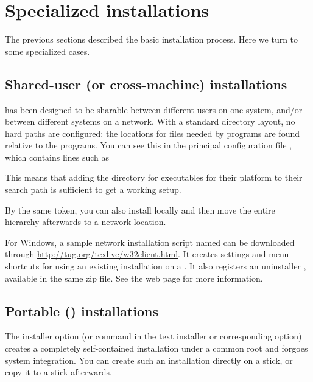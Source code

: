 \documentclass{article}
\begin{document}
\section{Specialized installations}

The previous sections described the basic installation process.  Here we
turn to some specialized cases.

\subsection{Shared-user (or cross-machine) installations}
\label{sec:sharedinstall}

\TL{} has been designed to be sharable between different users on one
system, and/or between different systems on a network. With a standard
directory layout, no hard paths are configured: the locations for files
needed by \TL{} programs are found relative to the programs.  You can
see this in the principal configuration file
, which contains lines such as
This means that adding the directory for \TL{} executables for their
platform to their search path is sufficient to get a working setup.

By the same token, you can also install \TL{} locally and then move
the entire hierarchy afterwards to a network location.

For Windows, a sample network installation script named
 can be downloaded through
\url{http://tug.org/texlive/w32client.html}.  It creates settings and
menu shortcuts for using an existing \TL{} installation on a .
It also registers an uninstaller , available
in the same zip file.  See the web page for more information.


\subsection{Portable (\USB{}) installations}
\label{sec:portable-tl}

The  installer option (or  command in the text
installer or corresponding \GUI{} option) creates a completely
self-contained \TL{} installation under a common root and forgoes system
integration. You can create such an installation directly on a \USB{}
stick, or copy it to a \USB{} stick afterwards.
\end{document}
